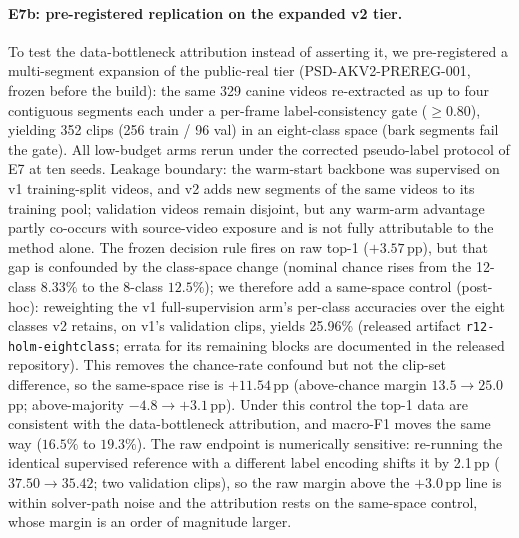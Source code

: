 \paragraph{E7b: pre-registered replication on the expanded v2 tier.}
To test the data-bottleneck attribution instead of asserting it, we pre-registered a multi-segment expansion of the public-real tier (PSD-AKV2-PREREG-001, frozen before the build): the same 329 canine videos re-extracted as up to four contiguous segments each under a per-frame label-consistency gate ($\geq$0.80), yielding 352 clips (256 train / 96 val) in an eight-class space (bark segments fail the gate). All low-budget arms rerun under the corrected pseudo-label protocol of E7 at ten seeds. Leakage boundary: the warm-start backbone was supervised on v1 training-split videos, and v2 adds new segments of the same videos to its training pool; validation videos remain disjoint, but any warm-arm advantage partly co-occurs with source-video exposure and is not fully attributable to the method alone. The frozen decision rule fires on raw top-1 ($+3.57$\,pp), but that gap is confounded by the class-space change (nominal chance rises from the 12-class $8.33\%$ to the 8-class $12.5\%$); we therefore add a same-space control (post-hoc): reweighting the v1 full-supervision arm's per-class accuracies over the eight classes v2 retains, on v1's validation clips, yields 25.96\% (released artifact \texttt{r12-holm-eightclass}; errata for its remaining blocks are documented in the released repository). This removes the chance-rate confound but not the clip-set difference, so the same-space rise is $+11.54$\,pp (above-chance margin $13.5\to25.0$\,pp; above-majority $-4.8\to+3.1$\,pp). Under this control the top-1 data are consistent with the data-bottleneck attribution, and macro-F1 moves the same way ($16.5\%$ to $19.3\%$). The raw endpoint is numerically sensitive: re-running the identical supervised reference with a different label encoding shifts it by 2.1\,pp ($37.50\to35.42$; two validation clips), so the raw margin above the $+3.0$\,pp line is within solver-path noise and the attribution rests on the same-space control, whose margin is an order of magnitude larger.

